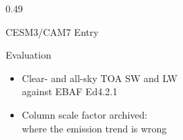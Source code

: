 \begin{frame}[t]
\begin{columns}[T]
\begin{column}{0.49\textwidth}
\begin{block}{CESM3/CAM7 Entry}
\begin{itemize}
\end{itemize}
\end{block}
\begin{block}{Evaluation}
\begin{itemize}
  \item Clear- and all-sky TOA SW and LW\\against EBAF Ed4.2.1
  \item Column scale factor archived:\\where the emission trend is wrong
\end{itemize}
\end{block}
\end{column}
\end{columns}
\end{frame}
